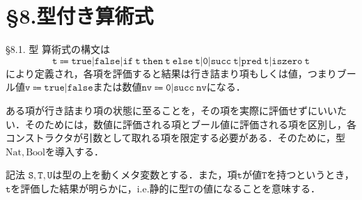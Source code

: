 \documentclass[9pt]{beamer}
\begin{document}
\section{\S8.型付き算術式}
\begin{frame}{\S 8.1. 型}
算術式の構文は\begin{equation*}
\mathtt{t\Coloneq true|false|if\ t\ then\ t\ else\ t|0|succ\ t|pred\ t|iszero\ t}
\end{equation*}
により定義され，各項を評価すると結果は行き詰まり項もしくは値，つまりブール値$\mathtt{v\Coloneq true|false}$または数値$\mathtt{nv\Coloneq 0|succ\ nv}$になる．

ある項が行き詰まり項の状態に至ることを，その項を実際に評価せずにいいたい．そのためには，数値に評価される項とブール値に評価される項を区別し，各コンストラクタが引数として取れる項を限定する必要がある．そのために，型$\mathrm{Nat, Bool}$を導入する．
\begin{alertblock}{記法}
	$\mathtt{S, T,U}$は型の上を動くメタ変数とする．また，項$\mathtt{t}$が値$\mathtt{T}$を持つというとき，$\mathtt{t}$を評価した結果が明らかに，i.e.静的に型$\mathtt{T}$の値になることを意味する．
\end{alertblock}
\end{frame}
\end{document}
